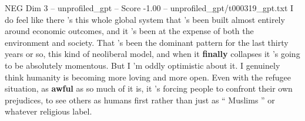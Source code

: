 \begin{textsample}{NEG Dim 3 – unprofiled\_gpt – Score -1.00 – unprofiled\_gpt/t000319\_gpt.txt}  \label{ex:f3_neg_017}
I do feel like there ’s this whole global system that ’s been built almost entirely around economic outcomes, and it ’s been at the expense of both the environment and society.
That ’s been the dominant pattern for the last thirty years or so, this kind of neoliberal model, and when it \textbf{finally} collapses it ’s going to be absolutely momentous.
But I ’m oddly optimistic about it.
I genuinely think humanity is becoming more loving and more open.
Even with the refugee situation, as \textbf{awful} as so much of it is, it ’s forcing people to confront their own prejudices, to see others as humans first rather than just as “ Muslims ” or whatever religious label.

\end{textsample}
